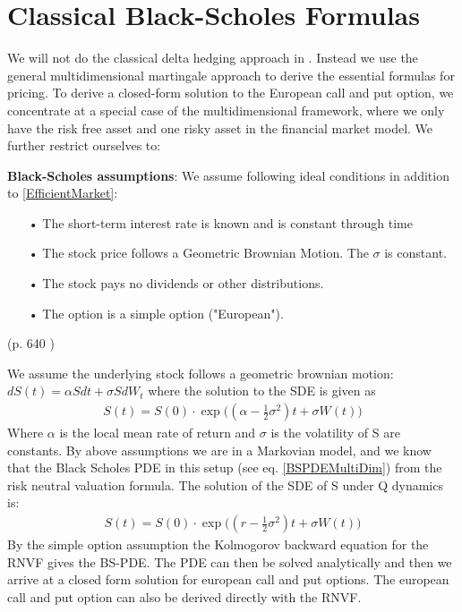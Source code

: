 \section{Classical Black-Scholes Formulas}\label{classicBS}
We will not do the classical delta hedging approach in \parencite{B-S-Paper}. Instead we use the general multidimensional martingale approach to derive the essential formulas for pricing. 
To derive a closed-form solution to the European call and put option, we concentrate at a special case of the multidimensional framework, where we only have the risk free asset and one risky asset in the financial market model. 
We further restrict ourselves to:
\theoremstyle{assumption}
\begin{assumption}{\textbf{Black-Scholes assumptions}:}\label{BS-Assumption}
We assume following ideal conditions in addition to \eqref{EfficientMarket}:
\begin{enumerate}
\item[•] The short-term interest rate is known and is constant through time 
\item[•] The stock price follows a Geometric Brownian Motion. The $\sigma$ is constant.\item[•] The stock pays no dividends or other distributions.
\item[•] The option is a simple option ("European").
\end{enumerate}
(p. 640 \parencite{B-S-Paper})
\end{assumption}

We assume the underlying stock follows a geometric brownian motion:
$dS(t)=\alpha S dt + \sigma S dW_t$ where the solution to the SDE is given as
\begin{equation}\label{GBM}
\begin{split}
S(t)=S(0) \cdot \exp \bigg( (\alpha -\frac{1}{2} \sigma^2) t + \sigma W(t) \bigg)
\end{split}
\end{equation}
Where $\alpha$ is the local mean rate of return and $\sigma$ is the volatility of S are constants. By above assumptions we are in a Markovian model, and we know that the Black Scholes PDE in this setup (see eq.  \ref{BSPDEMultiDim}) from the risk neutral valuation formula. The solution of the SDE of S under Q dynamics is:
\begin{equation*}\label{GBM}
\begin{split}
S(t)=S(0) \cdot \exp \bigg( (r -\frac{1}{2} \sigma^2) t + \sigma W(t) \bigg)
\end{split}
\end{equation*}
By the simple option assumption the Kolmogorov backward equation for the RNVF gives the BS-PDE. The PDE can then be solved analytically and then we arrive at a closed form solution for european call and put options. The european call and put option can also be derived directly with the RNVF. 

